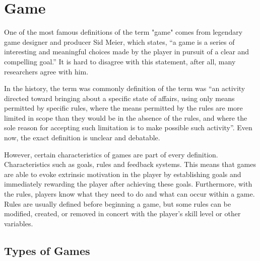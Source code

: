\documentclass[10pt,oneside,english,a4paper]{article}
\begin{document}
\section{Game} \label{game}

\par
One of the most famous definitions of the term "game" comes from legendary game designer and producer Sid Meier, which states, “a game is a series of interesting and meaningful choices made by the player in pursuit of a clear and compelling goal.” It is hard to disagree with this statement, after all, many researchers agree with him.\cite{Hu:gamification}
\par
In the history, the term was commonly definition of the term was “an activity directed toward bringing about a specific state of affairs, using only means permitted by specific rules, where the means permitted by the rules are more limited in scope than they would be in the absence of the rules, and where the sole reason for accepting such limitation is to make possible such activity”.\cite{suits:game} Even now, the exact definition is unclear and debatable. 
\par 
However, certain characteristics of games are part of every definition. Characteristics such as goals, rules and feedback systems. This means that games are able to evoke extrinsic motivation in the player by establishing goals and immediately rewarding the player after achieving these goals. Furthermore, with the rules, players know what they need to do and what can occur within a game. Rules are usually defined before beginning a game, but some rules can be modified, created, or removed in concert with the player's skill level or other variables.\cite{Hu:gamification}


\subsection{Types of Games} \label{types of games}
\end{document}
